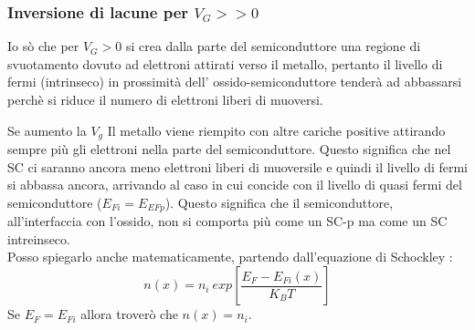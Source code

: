 \cleardoublepage
\subsubsection{Inversione di lacune per $V_G >> 0$}
Io sò che per $V_G>0$ si crea dalla parte del semiconduttore una regione di svuotamento dovuto ad elettroni attirati verso il metallo, pertanto il livello di fermi (intrinseco) in prossimità dell' ossido-semiconduttore tenderà ad abbassarsi perchè si riduce il numero di elettroni liberi di muoversi.

Se aumento la $V_g$ Il metallo viene riempito con altre cariche positive attirando sempre più gli elettroni nella parte del semiconduttore. Questo significa che nel SC ci saranno ancora meno elettroni liberi di muoversile e quindi il livello di fermi si abbassa ancora, arrivando al caso in cui concide con il livello di quasi fermi del semiconduttore ($E_{Fi}=E_{EFp}$).
Questo significa che il semiconduttore, all'interfaccia con l'ossido, non si comporta più come un SC-p ma come un SC intreinseco.\\
Posso spiegarlo anche matematicamente, partendo dall'equazione di Schockley :
%
\begin{equation}
    n(x) = n_i\ exp\left[\frac{E_F-E_{Fi}(x)}{K_BT}\right]
\end{equation}
Se $E_F=E_{Fi}$ allora troverò che $n(x)=n_i$.\\


